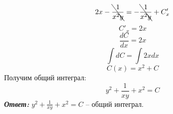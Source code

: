 \documentclass[a5paper, 10pt]{article}
\theoremstyle{definition}
\theoremstyle{plain}
\theoremstyle{remark}
\begin{document}
\begin{equation*}
2x - \bcancel{\frac{1}{x^2y}}  =   -\bcancel{\frac{1}{x^2y}} + C'_x
\end{equation*}
\begin{equation*}
 C'_x = 2x
\end{equation*}
\begin{equation*}
\frac{dC}{dx} = 2x
\end{equation*}
\begin{equation*}
\int dC= \int 2x dx
\end{equation*}
\begin{equation*}
C(x) = x^2 + C
\end{equation*}
Получим общий интеграл:
\begin{equation*}
y^2 + \frac{1}{xy} + x^2 =  C
\end{equation*}
\textit{\textbf{Ответ:}} $ y^2 + \frac{1}{xy} + x^2 =  C$ -- общий интеграл.
\newpage
\end{document}
